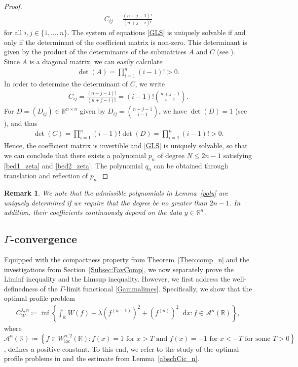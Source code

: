 \documentclass{article}
\newcommand{\dd}{\mathop{}\mathrm{d}} %
\newcommand{\lam}{\lambda}
\numberwithin{figure}{section}
\def\AAA{{\mathcal A}} \def\calB{{\mathcal B}} \def\calC{{\mathcal C}}
\newcommand{\R}{\mathbb{R}}
\newtheorem{rem}[theorem]{Remark}
\numberwithin{equation}{section}
\begin{document}
\begin{proof}
\begin{align}
        C_{ij}=\frac{(n+j-1)!}{(n+j-i)!}
    \end{align}
    for all $i,j \in \{1,\ldots,n\}$. The system of equations \eqref{GLS} is uniquely solvable if and only if the determinant of the coefficient matrix is non-zero. This determinant is given by the product of the determinants of the submatrices $A$ and $C$ (see \cite[Section~2]{Sil}). Since $A$ is a diagonal matrix, we can easily calculate
    \begin{align}
        \det(A)=\prod_{i=1}^n (i-1)! > 0.
    \end{align}
    In order to determine the determinant of $C$, we write
    \begin{align}
        C_{ij}=\frac{(n+j-1)!}{(n+j-i)!}=(i-1)! \binom{n+j-1}{i-1}.
    \end{align}
    For $D=(D_{ij})\in \R^{n \times n}$ given by $D_{ij}=\binom{n+j-1}{i-1}$, we have $\det(D)=1$ (see \cite[Paragraph~167]{Net}), and thus
    \begin{align}
        \det(C)=\prod_{i=1}^n (i-1)! \det(D)
        =\prod_{i=1}^n (i-1)! > 0.
    \end{align}
    Hence, the coefficient matrix is invertible and \eqref{GLS} is uniquely solvable, so that we can conclude that there exists a polynomial $p_n$ of degree $N \leq 2n-1$ satisfying \eqref{bed1_zeta} and \eqref{bed2_zeta}. The polynomial $q_n$ can be obtained through translation and reflection of $p_n$.
 \end{proof}
 \begin{rem} \label{contpol}
     We note that the admissible polynomials in Lemma~\ref{poly} are uniquely determined if we require that the degree be no greater than $2n-1$. In addition, their coefficients continuously depend on the data $y \in \R^n$.
 \end{rem}



\subsection{\texorpdfstring{$\Gamma$}{Gamma}-convergence} \label{Subsec:Gamman}

 Equipped with the compactness property from Theorem~\ref{Theo:comp_n} and the investigations from Section~\ref{Subsec:FavComp}, we now separately prove the Liminf inequality and the Limsup inequality. However, we first address the well-definedness of the $\Gamma$-limit functional \eqref{Gammalimes}. Specifically, we show that the optimal profile problem
 \begin{align} \label{Gammaconst}
    C_W^{\lam,n} \coloneq  \inf\left\{\int_\R W(f) - \lam(f^{(n-1)})^2 + (f^{(n)})^2\dd x : f \in \AAA^n(\R) \right\},
\end{align}
where $\AAA^n(\R) \coloneq  \left\{ f \in W^{n,2}_{\mathrm{loc}}(\R) \colon f(x)=1 \text{ for } x > T \text{ and } f(x) = -1 \text{ for } x < -T  \text{ for some } T>0\right\}$, defines a positive constant. To this end, we refer to the study of the optimal profile problems in \cite[Section~4]{BruDonSol} and the estimate from Lemma~\ref{abschCic_n}.
\end{document}
